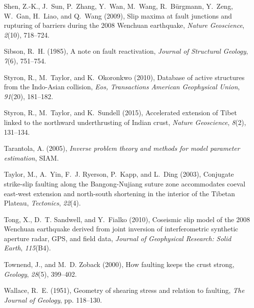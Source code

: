 \documentclass[draft,jgrga]{AGUTeX}
\begin{document}
\begin{article}
\begin{thebibliography}{90}
Shen, Z.-K., J.~Sun, P.~Zhang, Y.~Wan, M.~Wang, R.~B{\"u}rgmann, Y.~Zeng,
  W.~Gan, H.~Liao, and Q.~Wang (2009), Slip maxima at fault junctions and
  rupturing of barriers during the 2008 {W}enchuan earthquake, \textit{Nature
  Geoscience}, \textit{2}(10), 718--724.

Sibson, R.~H. (1985), A note on fault reactivation, \textit{Journal of
  Structural Geology}, \textit{7}(6), 751--754.

Styron, R., M.~Taylor, and K.~Okoronkwo (2010), Database of active structures
  from the {I}ndo-{A}sian collision, \textit{Eos, Transactions American
  Geophysical Union}, \textit{91}(20), 181--182.

Styron, R., M.~Taylor, and K.~Sundell (2015), Accelerated extension of {T}ibet
  linked to the northward underthrusting of {I}ndian crust, \textit{Nature
  Geoscience}, \textit{8}(2), 131--134.
 
Tarantola, A. (2005), \textit{Inverse problem theory and methods for model
  parameter estimation}, SIAM.

Taylor, M., A.~Yin, F.~J. Ryerson, P.~Kapp, and L.~Ding (2003), Conjugate
  strike-slip faulting along the {B}angong-{N}ujiang suture zone accommodates
  coeval east-west extension and north-south shortening in the interior of the
  {T}ibetan {P}lateau, \textit{Tectonics}, \textit{22}(4).

Tong, X., D.~T. Sandwell, and Y.~Fialko (2010), Coseismic slip model of the
  2008 {W}enchuan earthquake derived from joint inversion of interferometric
  synthetic aperture radar, {G}{P}{S}, and field data, \textit{Journal of
  Geophysical Research: Solid Earth}, \textit{115}(B4).

Townend, J., and M.~D. Zoback (2000), How faulting keeps the crust strong,
  \textit{Geology}, \textit{28}(5), 399--402.

Wallace, R.~E. (1951), Geometry of shearing stress and relation to faulting,
  \textit{The Journal of Geology}, pp. 118--130.


\end{thebibliography}
\end{article}
\end{document}
